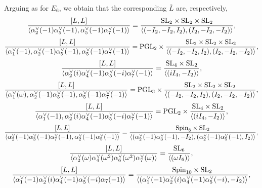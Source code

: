 \documentclass[11pt]{amsart}
\newcommand{\Spin}{{\operatorname{Spin}}}
\newcommand{\SL}{{{\mbox{\rm SL}}}}
\newcommand{\PGL}{{{\mbox{\rm PGL}}}}
\numberwithin{equation}{section}
\begin{document}
	Arguing as for $E_6$, we obtain that the corresponding $\overline{L}$ are, respectively,
	\begin{equation}\label{eq: E7L1}
		\frac{[L,L]}{\langle \alpha_2^\vee(-1)\alpha_5^\vee(-1), \alpha_5^\vee(-1)\alpha_7^\vee(-1)\rangle}=\frac{\SL_2\times \SL_2 \times \SL_2}{\langle (-I_2,-I_2,I_2), (I_2,-I_2,-I_2)\rangle},
	\end{equation}
	\begin{equation}\label{eq: E7L2}
		\frac{[L,L]}{\langle \alpha_1^\vee(-1),\alpha_2^\vee(-1)\alpha_5^\vee(-1), \alpha_5^\vee(-1)\alpha_7^\vee(-1)\rangle}=\PGL_2\times \frac{\SL_2\times \SL_2 \times \SL_2}{\langle (-I_2,-I_2,I_2), (I_2,-I_2,-I_2)\rangle},
	\end{equation}
	\begin{equation}\label{eq: E7L3}
		\frac{[L,L]}{\langle \alpha_2^\vee(i)\alpha_4^\vee(-1) \alpha_5^\vee(-i)\alpha_7^\vee(-1)\rangle}=\frac{\SL_4\times \SL_2}{\langle (iI_4,-I_2) \rangle},
	\end{equation}
	\begin{equation}\label{eq: E7L4}
		\frac{[L,L]}{\langle \alpha_1^\vee(\omega),\alpha_2^\vee(-1)\alpha_5^\vee(-1), \alpha_5^\vee(-1)\alpha_7^\vee(-1)\rangle}=\PGL_3\times \frac{\SL_2\times \SL_2 \times \SL_2}{\langle (-I_2,-I_2,I_2), (I_2,-I_2,-I_2)\rangle},
	\end{equation}
	\begin{equation}\label{eq: E7L5}
		\frac{[L,L]}{\langle \alpha_1^\vee(-1),  \alpha_2^\vee(i)\alpha_4^\vee(-1) \alpha_5^\vee(-i)\alpha_7^\vee(-1)\rangle}=\PGL_2\times \frac{\SL_4\times \SL_2}{\langle (iI_4,-I_2) \rangle},
	\end{equation}
	\begin{equation}\label{eq: E7L6}
		\frac{[L,L]}{\langle \alpha_2^\vee(-1)\alpha_3^\vee(-1) \alpha_7^\vee(-1),\alpha_2^\vee(-1)\alpha_5^\vee(-1)\rangle}=\frac{\Spin_8\times \SL_2}{\langle (\alpha_2^\vee(-1)\alpha_3^\vee(-1),-I_2), (\alpha_2^\vee(-1)\alpha_5^\vee(-1),I_2) \rangle},
	\end{equation}
	\begin{equation}\label{eq: E7L7}
		\frac{[L,L]}{\langle \alpha_2^\vee(\omega)\alpha_4^\vee(\omega^2) \alpha_6^\vee(\omega^2)\alpha_7^\vee(\omega)\rangle}=\frac{\SL_6}{\langle (\omega I_6) \rangle},
	\end{equation}
	\begin{equation}\label{eq: E7L8}
		\frac{[L,L]}{\langle \alpha_1^\vee(-1)\alpha_2^\vee(i)\alpha_4^\vee(-1)\alpha_5^\vee(-i)\alpha_7(-1)\rangle}=\frac{\Spin_{10}\times \SL_2}{\langle (\alpha_1^\vee(-1)\alpha_2^\vee(i)\alpha_4^\vee(-1)\alpha_5^\vee(-i), -I_2) \rangle},
	\end{equation}
\end{document}
